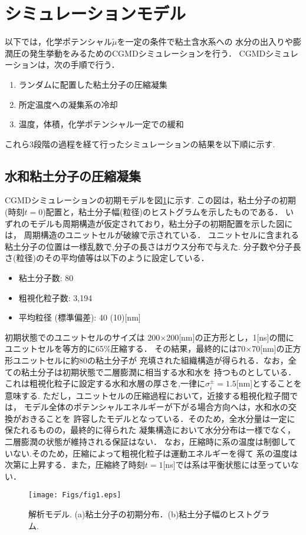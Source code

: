 \section{シミュレーションモデル}
以下では，化学ポテンシャル$\tilde \mu$を一定の条件で粘土含水系への
水分の出入りや膨潤圧の発生挙動をみるためのCGMDシミュレーションを行う．
CGMDシミュレーションは，次の手順で行う．
\begin{enumerate}
\item
	ランダムに配置した粘土分子の圧縮凝集
\item
	所定温度への凝集系の冷却
\item
	温度，体積，化学ポテンシャル一定での緩和
\end{enumerate}
これら3段階の過程を経て行ったシミュレーションの結果を以下順に示す.
\subsection{水和粘土分子の圧縮凝集}
CGMDシミュレーションの初期モデルを図\ref{fig:fig1}に示す.
この図は，粘土分子の初期(時刻$t=0$)配置と，粘土分子幅(粒径)のヒストグラムを示したものである．
いずれのモデルも周期構造が仮定されており，粘土分子の初期配置を示した図には，
周期構造のユニットセルが破線で示されている．
ユニットセルに含まれる粘土分子の位置は一様乱数で,分子の長さはガウス分布で与えた.
分子数や分子長さ(粒径)のその平均値等は以下のように設定している．
\begin{itemize}
	\item 粘土分子数: 80
	\item 粗視化粒子数: 3,194
	\item 平均粒径 (標準偏差): 40 (10)[{\rm nm}]
\end{itemize}
初期状態でのユニットセルのサイズは
200$\times$200[nm]の正方形とし，1[ns]の間にユニットセルを等方的に65\%圧縮する．
その結果，最終的には70$\times$70[nm]の正方形ユニットセルに約80の粘土分子が
充填された組織構造が得られる．なお，全ての粘土分子は初期状態で二層膨潤に相当する水和水を
持つものとしている．
これは粗視化粒子に設定する水和水層の厚さを,一律に$\sigma_i^\pm=1.5$[nm]とすることを意味する.
ただし，ユニットセルの圧縮過程において，近接する粗視化粒子間では，
モデル全体のポテンシャルエネルギーが下がる場合方向へは，水和水の交換がおきることを
許容したモデルとなっている．そのため，全水分量は一定に保たれるものの，最終的に得られた
凝集構造において水分分布は一様でなく，二層膨潤の状態が維持される保証はない．
なお，圧縮時に系の温度は制御していない.そのため，圧縮によって粗視化粒子は運動エネルギーを得て
系の温度は次第に上昇する．また，圧縮終了時刻$t=1$[ns]では系は平衡状態には至っていない．
\begin{figure}[h]
	\begin{center}
	\texttt{[image: Figs/fig1.eps]} 
	\end{center}
	\caption{
		解析モデル. (a)粘土分子の初期分布．(b)粘土分子幅のヒストグラム. 
	} 
	\label{fig:fig1}
\end{figure}

